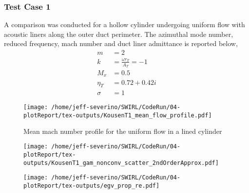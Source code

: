 \subsubsection{Test Case 1}
A comparison was conducted for a hollow cylinder undergoing uniform flow with
acoustic liners along the outer duct perimeter. The azimuthal mode number, reduced 
frequency, mach number and duct liner admittance is reported below,
\begin{align*}
    m &= 2 \\
    k &= \frac{\omega r_T}{A_T} = -1 \\
    M_x &= 0.5 \\
    \eta_T &= 0.72 + 0.42i\\
    \sigma &= 1
\end{align*} 

\begin{figure}[h!]
    \centering
    \texttt{[image: /home/jeff-severino/SWIRL/CodeRun/04-plotReport/tex-outputs/KousenT1\_mean\_flow\_profile.pdf]}
    \caption{Mean mach number profile for the uniform flow in a lined cylinder}
    \label{fig:1}
\end{figure}


\begin{figure}[h!]
    \centering
    \texttt{[image: /home/jeff-severino/SWIRL/CodeRun/04-plotReport/tex-outputs/KousenT1\_gam\_nonconv\_scatter\_2ndOrderApprox.pdf]}
\end{figure}







\begin{figure}[h!]
    \centering
    \texttt{[image: /home/jeff-severino/SWIRL/CodeRun/04-plotReport/tex-outputs/egv\_prop\_re.pdf]}
    \label{fig:prop_re}
\end{figure}

